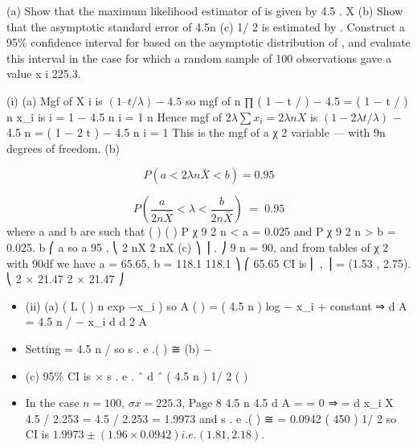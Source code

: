 \documentclass[a4paper,12pt]{article}
\begin{document}
(a) Show that the maximum likelihood estimator of
is given by
4.5
.
X
(b)
Show that the asymptotic standard error of
4.5n
(c)
1/ 2
is estimated by
.
Construct a 95\% confidence interval for based on the asymptotic
distribution of , and evaluate this interval in the case for which a
random sample of 100 observations gave a value
x i 225.3.



\newpage
(i)
(a)
Mgf of X i is $(1 – t / \lambda ) − 4.5$ so mgf of
n
∏ ( 1 − t / \lambda )
− 4.5
= ( 1 − t / \lambda )
n
\sum x_i
is
i = 1
− 4.5 n
i = 1
n
Hence mgf of $2 \lambda \sum x_i = 2 \lambda nX$ is $( 1 − 2 \lambda t / \lambda )$
− 4.5 n
= ( 1 − 2 t )
− 4.5 n
i = 1
This is the mgf of a χ 2 variable — with 9n degrees of freedom.
(b)

\[ P( a < 2 \lambda n \bar{X} < b)  =0.95 \]

\[ P \left(  \frac{a}{2  n \bar{X}}  < \lambda <  \frac{b}{2  n \bar{X}} \right) \;=\; 0.95\]
where a and b are such that
(
)
(
)
P χ 9 2 n < a = 0.025 and P χ 9 2 n > b = 0.025.
b
⎛ a
so a 95%
,
⎝ 2 nX 2 nX
(c)
⎞
⎟ .
⎠
9 n = 90, and from tables of χ 2 with 90df we have a = 65.65, b = 118.1
118.1 ⎞
⎛ 65.65
CI is ⎜
,
⎟ = (1.53 , 2.75).
⎝ 2 × 21.47 2 × 21.47 ⎠
\begin{itemize}
\item (ii)
(a)
(
L ( \lambda ) \propto {} n exp −\lambda \sum x_i
)
so
A ( \lambda ) = ( 4.5 n ) log \lambda − \lambda \sum x_i + constant
⇒
d A
= 4.5 n / \lambda − \sum x_i
d \lambda
d 2 A
\item Setting
= 4.5 n /  so s . e .( \hat{\lambda}) ≅
(b) −
\item (c) 95\% CI is \hat{\lambda} × s . e . \lambda ˆ
d 
{
\lambda ˆ
( 4.5 n ) 1/ 2
( ) }
\item In the case $n = 100$, $\sigma x = 225.3$,
Page 8
4.5 n 4.5
d A
=
= 0 ⇒ \hat{\lambda}=
d \lambda
\sum x_i X
4.5 / 2.253
\hat{\lambda}= 4.5 / 2.253 = 1.9973 and s . e .( \hat{\lambda}) ≅
= 0.0942
( 450 ) 1/ 2
so CI is $1.9973 \pm(1.96 \times  0.0942) i.e. (1.81 , 2.18)$.
\end{itemize}
\end{document}
